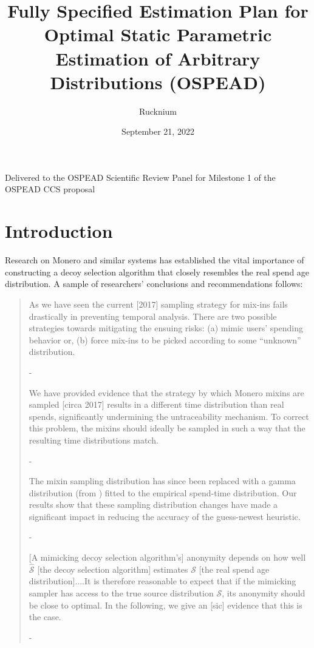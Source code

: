 \documentclass[english]{article}
\begin{document}
\title{Fully Specified Estimation Plan for \\
Optimal Static Parametric Estimation of Arbitrary Distributions (OSPEAD)}
\author{Rucknium}
\date{September 21, 2022}
\maketitle

Delivered to the OSPEAD Scientific Review Panel for Milestone 1 of
the OSPEAD CCS proposal

\section{Introduction}

Research on Monero and similar systems has established the vital importance
of constructing a decoy selection algorithm that closely resembles
the real spend age distribution. A sample of researchers' conclusions
and recommendations follows:
\begin{quote}
As we have seen the current {[}2017{]} sampling strategy for mix-ins
fails drastically in preventing temporal analysis. There are two possible
strategies towards mitigating the ensuing risks: (a) mimic users\textquoteright{}
spending behavior or, (b) force mix-ins to be picked according to
some \textquotedblleft unknown\textquotedblright{} distribution.

- \cite{Kumar2017}

We have provided evidence that the strategy by which Monero mixins
are sampled {[}circa 2017{]} results in a different time distribution
than real spends, significantly undermining the untraceability mechanism.
To correct this problem, the mixins should ideally be sampled in such
a way that the resulting time distributions match.

- \cite{2018}

The mixin sampling distribution has since been replaced with a gamma
distribution (from \cite{2018}) fitted to the empirical spend-time
distribution. Our results show that these sampling distribution changes
have made a significant impact in reducing the accuracy of the guess-newest
heuristic.

- \cite{Ye2020}

{[}A mimicking decoy selection algorithm's{]} anonymity depends on
how well $\hat{\mathcal{S}}$ {[}the decoy selection algorithm{]}
estimates $\mathcal{S}$ {[}the real spend age distribution{]}....It
is therefore reasonable to expect that if the mimicking sampler has
access to the true source distribution $\mathcal{S}$, its anonymity
should be close to optimal. In the following, we give an {[}sic{]}
evidence that this is the case.

- \cite{Ronge2021}
\end{quote}
\end{document}
